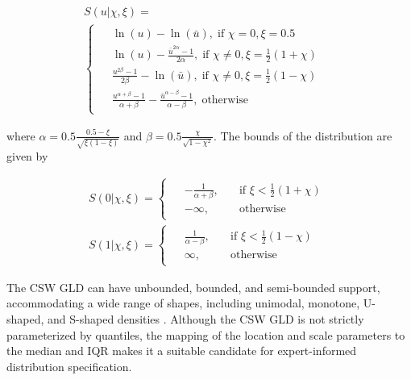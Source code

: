 \documentclass[
  fleqn,
  deca,
  blindrev
]{informs4}
\begin{document}
\[
\begin{gathered}
S(u\vert\chi,\xi)=\\
\begin{cases}
\begin{aligned}
&\ln(u)-\ln(\bar{u}),  \; \text{if }\chi=0,\xi=0.5&\\
&\ln(u)-\frac{\bar{u}^{2\alpha}-1}{2\alpha}, \; \text{if }\chi\neq0,\xi=\frac{1}{2}(1+\chi)&\\
&\frac{u^{2\beta}-1}{2\beta}-\ln(\bar{u}), \; \text{if }\chi\neq0,\xi=\frac{1}{2}(1-\chi)&\\
&\frac{u^{\alpha+\beta}-1}{\alpha+\beta}-\frac{\bar{u}^{\alpha-\beta}-1}{\alpha-\beta}, \; \text{otherwise}
\end{aligned}
\end{cases}
\end{gathered}
\]

where \(\alpha=0.5\frac{0.5-\xi}{\sqrt{\xi(1-\xi)}}\) and
\(\beta=0.5\frac{\chi}{\sqrt{1-\chi^2}}\). The bounds of the
distribution are given by

\[
\begin{gathered}
S(0\vert\chi,\xi)=\begin{cases}
\begin{aligned}
&-\frac{1}{\alpha+\beta},\quad &\text{if }\xi<\frac{1}{2}(1+\chi)\\
&-\infty, \quad &\text{otherwise}
\end{aligned}
\end{cases}\\
S(1\vert\chi,\xi)=\begin{cases}
\begin{aligned}
&\frac{1}{\alpha-\beta},\quad &\text{if }\xi<\frac{1}{2}(1-\chi)\\
&\infty, \quad &\text{otherwise}
\end{aligned}
\end{cases}
\end{gathered}
\]

The CSW GLD can have unbounded, bounded, and semi-bounded support,
accommodating a wide range of shapes, including unimodal, monotone,
U-shaped, and S-shaped densities
\citep{chalabi2012FlexibleDistributionModeling}. Although the CSW GLD is
not strictly parameterized by quantiles, the mapping of the location and
scale parameters to the median and IQR makes it a suitable candidate for
expert-informed distribution specification.
\end{document}
